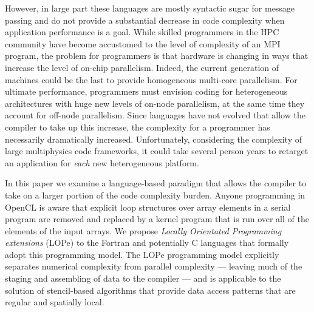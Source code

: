 
However, in large part these languages are mostly syntactic sugar for
message passing and do not provide a substantial decrease in code
complexity when application performance is a
goal\cite{hasert:2011:EuroMPI}.  While skilled programmers in the HPC
community have become accustomed to the level of complexity of an MPI
program, the problem for programmers is that hardware is changing in
ways that increase the level of on-chip parallelism.  Indeed, the
current generation of machines could be the last to provide
homogeneous multi-core parallelism\cite{JORSjors.aw}.  For ultimate
performance, programmers must envision coding for heterogeneous
architectures with huge new levels of on-node parallelism, at the same
time they account for off-node parallelism.
Since languages have not evolved that allow the compiler to take up
this increase, the complexity for a programmer has necessarily
dramatically increased.  Unfortunately, considering the complexity of
large multiphysics code frameworks, it could take several person years
to retarget an application for \emph{each} new heterogeneous
platform\cite{DBLP:journals/corr/DubeyS13}.


In this paper we examine a language-based paradigm that allows the
compiler to take on a larger portion of the code complexity burden.
Anyone programming in OpenCL is aware that explicit loop
structures over array elements in a serial program are removed and
replaced by a kernel program that is run over all of the elements of
the input arrays.  We propose \emph{Locally Orientated Programming
extensions} (LOPe) to the Fortran and potentially C languages that
formally adopt this programming model.  The LOPe programming model
explicitly separates numerical complexity from parallel complexity ---
leaving much of the staging and assembling of data to the compiler ---
and is applicable to the solution of stencil-based algorithms that
provide data access patterns that are regular and spatially local.

